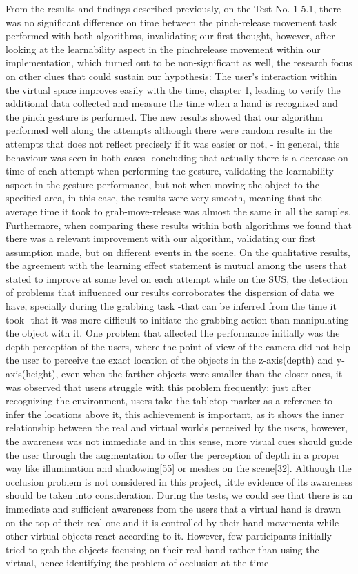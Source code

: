 From the results and findings described previously, on the Test No. 1 5.1, there was no significant difference on time between the pinch-release movement task performed with both algorithms, invalidating our first thought, however, after looking at the learnability aspect in the pinchrelease movement within our implementation, which turned out to be non-significant as well, the research focus on other clues that could sustain our hypothesis: The user’s interaction within the virtual space improves easily with the time, chapter 1, leading to verify the additional data collected and measure the time when a hand is recognized and the pinch gesture is performed. The new results showed that our algorithm performed well along the attempts although there were random results in the attempts that does not reflect precisely if it was easier or not, - in general, this behaviour was seen in both cases- concluding that actually there is a decrease on time of each attempt when performing the gesture, validating the learnability aspect in the gesture performance, but not when moving the object to the specified area, in this case, the results were very smooth, meaning that the average time it took to grab-move-release was almost the same in all the samples. Furthermore, when comparing these results within both algorithms we found that there was a relevant improvement with our algorithm, validating our first assumption made, but on different events in the scene. On the qualitative results, the agreement with the learning effect statement is mutual among the users that stated to improve at some level on each attempt while on the SUS, the detection of problems that influenced our results corroborates the dispersion of data we have, specially during the grabbing task -that can be inferred from the time it took- that it was more difficult to initiate the grabbing action than manipulating the object with it. One problem that affected the performance initially was the depth perception of the users, where the point of view of the camera did not help the user to perceive the exact location of the objects in the z-axis(depth) and y-axis(height), even when the farther objects were smaller than the closer ones, it was observed that users struggle with this problem frequently; just after recognizing the environment, users take the tabletop marker as a reference to infer the locations above it, this achievement is important, as it shows the inner relationship between the real and virtual worlds perceived by the users, however, the awareness was not immediate and in this sense, more visual cues should guide the user through the augmentation to offer the perception of depth in a proper way like illumination and shadowing[55] or meshes on the scene[32]. Although the occlusion problem is not considered in this project, little evidence of its awareness should be taken into consideration. During the tests, we could see that there is an immediate and sufficient awareness from the users that a virtual hand is drawn on the top of their real one and it is controlled by their hand movements while other virtual objects react according to it. However, few participants initially tried to grab the objects focusing on their real hand rather than using the virtual, hence identifying the problem of occlusion at the time 
